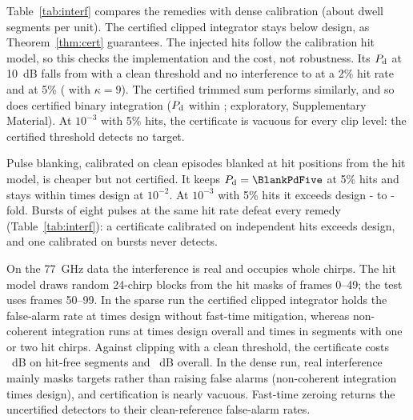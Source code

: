 \documentclass[journal]{IEEEtran}
\begin{document}
Table~\ref{tab:interf} compares the remedies with dense calibration (about \DwellSegsPerUnit{} dwell segments per unit). The certified clipped integrator stays below design, as Theorem~\ref{thm:cert} guarantees. The injected hits follow the calibration hit model, so this checks the implementation and the cost, not robustness. Its $P_{\rm d}$ at 10~dB falls from \CleanClipPdTen{} with a clean threshold and no interference to \CertSixPdTwo{} at a 2\% hit rate and \CertSixPdFive{} at 5\% (\CertNinePdFive{} with $\kappa=9$). The certified trimmed sum performs similarly, and so does certified binary integration ($P_{\rm d}$ within \BinCertGapMax; exploratory, Supplementary Material). At $10^{-3}$ with 5\% hits, the certificate is vacuous for every clip level: the certified threshold detects no target.

Pulse blanking, calibrated on clean episodes blanked at hit positions from the hit model, is cheaper but not certified. It keeps $P_{\rm d}=\BlankPdFive$ at 5\% hits and stays within \BlankPfaMax{} times design at $10^{-2}$. At $10^{-3}$ with 5\% hits it exceeds design \BlankFiveThreeMin- to \BlankFiveThreeMax-fold. Bursts of eight pulses at the same hit rate defeat every remedy (Table~\ref{tab:interf}): a certificate calibrated on independent hits exceeds design, and one calibrated on bursts never detects.

On the 77~GHz data the interference is real and occupies whole chirps. The hit model draws random 24-chirp blocks from the hit masks of frames 0--49; the test uses frames 50--99. In the sparse run the certified clipped integrator holds the false-alarm rate at \JCertPfaC{} times design without fast-time mitigation, whereas non-coherent integration runs at \JDinPfaC{} times design overall and \JDinPfaCone{} times in segments with one or two hit chirps. Against clipping with a clean threshold, the certificate costs \JCertCostClean~dB on hit-free segments and \JCertCostAll~dB overall. In the dense run, real interference mainly masks targets rather than raising false alarms (non-coherent integration \JDinPfaA{} times design), and certification is nearly vacuous. Fast-time zeroing returns the uncertified detectors to their clean-reference false-alarm rates.
\end{document}
